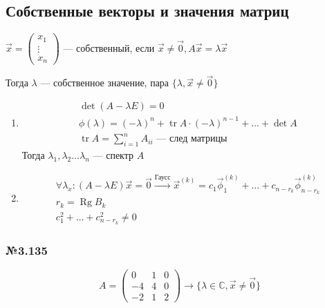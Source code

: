 \documentclass{article}
\DeclareMathOperator*{\Rg}{Rg}
\DeclareMathOperator*{\Tr}{tr}
\begin{document}
\subsection{Собственные векторы и значения матриц}

$\vec{x} = \begin{pmatrix}x_1 \\ \vdots \\ x_n\end{pmatrix}$ --- собственный, если
$\vec{x} \ne \vec{0}, A\vec{x} = \lambda \vec{x}$

Тогда $\lambda$ --- собственное значение, пара $\{\lambda, \vec{x} \ne \vec{0} \}$

\begin{enumerate}
	\item \begin{gather*}
		\det(A - \lambda E) = 0 \\
		\phi (\lambda) = (-\lambda)^n + \Tr A \cdot (-\lambda)^{n-1} + \dots + \det A \\
		\Tr A = \sum_{i=1}^{n} A_{ii} \text{ --- след матрицы}
	\end{gather*}
	Тогда $\lambda_1, \lambda_2 \dots \lambda_n$ --- спектр $A$
	\item \begin{gather*}
		\forall \lambda_x : (A - \lambda E) \vec{x} = \vec{0} \stackrel{\text{Гаусс}}{\rightarrow}
		\vec{x}^{(k)} = c_1 \vec{\phi}_1^{(k)} + \dots + c_{n-r_k} \vec{\phi}_{n-r_k}^{(k)} \\
		r_k = \Rg B_k \\
		c_1^2 + \dots + c_{n-r_k}^2 \ne 0
	\end{gather*}
\end{enumerate}

\subsubsection*{№3.135}

\[
	A = \begin{pmatrix}
		0 & 1 & 0 \\
		-4 & 4 & 0 \\
		-2 & 1 & 2
	\end{pmatrix} \rightarrow \{ \lambda \in \mathbb{C}, \vec{x} \ne \vec{0} \}
\]
\end{document}
